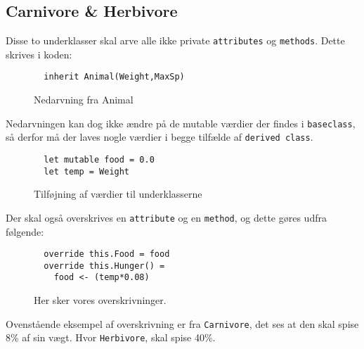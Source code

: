 \documentclass[a4paper,10pt]{article}
\begin{document}
\subsection{Carnivore \& Herbivore}
Disse to underklasser skal arve alle ikke private \texttt{attributes} og \texttt{methods}. Dette skrives i koden:
\begin{figure}[H]
\lstset{language=FSharp}  
\begin{lstlisting}
  inherit Animal(Weight,MaxSp)
\end{lstlisting}
    \centering
    \caption{Nedarvning fra Animal}
    \label{fig:my_label}
\end{figure}
Nedarvningen kan dog ikke ændre på de mutable værdier der findes i \texttt{baseclass}, så derfor må der laves nogle værdier i begge tilfælde af \texttt{derived class}.
\begin{figure}[H]
\lstset{language=FSharp}  
\begin{lstlisting}
  let mutable food = 0.0
  let temp = Weight
\end{lstlisting}
    \centering
    \caption{Tilføjning af værdier til underklasserne}
    \label{fig:my_label}
\end{figure}\newpage
Der skal også overskrives en \texttt{attribute} og en \texttt{method}, og dette gøres udfra følgende:
\begin{figure}[H]
\lstset{language=FSharp}  
\begin{lstlisting}
  override this.Food = food
  override this.Hunger() =
    food <- (temp*0.08)
\end{lstlisting}
    \centering
    \caption{Her sker vores overskrivninger.}
    \label{fig:my_label}
\end{figure}
Ovenstående eksempel af overskrivning er fra \texttt{Carnivore}, det ses at den skal spise 8\% af sin vægt. Hvor \texttt{Herbivore}, skal spise 40\%.
\end{document}
